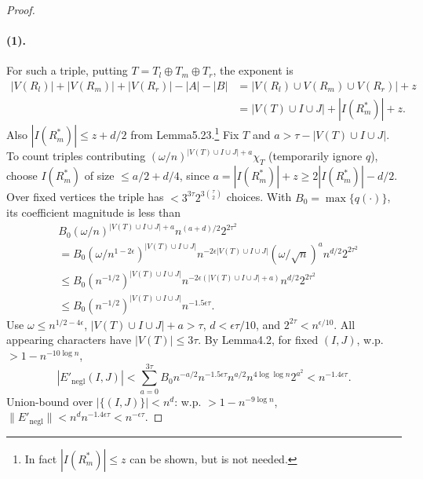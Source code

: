 \begin{proof}
\paragraph{(1).} For such a triple, putting $T=T_l\oplus T_m\oplus T_r$, the exponent is
\begin{align*}|V(R_l)|+|V(R_m)|+|V(R_r)|-|A|-|B|&=|V(R_l)\cup V(R_m)\cup V(R_r)|+z\\&=|V(T)\cup I\cup J|+|I(R^*_m)|+z.\end{align*}
Also $|I(R^*_m)|\le z+d/2$ from Lemma5.23.\footnote{In fact $|I(R^*_m)|\le z$ can be shown, but is not needed.} Fix $T$ and $a>\tau-|V(T)\cup I\cup J|$. To count triples contributing $(\omega/n)^{|V(T)\cup I\cup J|+a}\chi_T$ (temporarily ignore $q$), choose $I(R^*_m)$ of size $\le a/2+d/4$, since $a=|I(R^*_m)|+z\ge2|I(R^*_m)|-d/2$. Over fixed vertices the triple has $<3^{3\tau}2^{3\binom\tau2}$ choices. With $B_0=\max\{q(\cdot)\}$, its coefficient magnitude is less than
\begin{align*}&B_0(\omega/n)^{|V(T)\cup I\cup J|+a}n^{(a+d)/2}2^{2\tau^2}\\&=B_0(\omega/n^{1-2\epsilon})^{|V(T)\cup I\cup J|}n^{-2\epsilon|V(T)\cup I\cup J|}(\omega/\sqrt n)^an^{d/2}2^{2\tau^2}\\&\le B_0(n^{-1/2})^{|V(T)\cup I\cup J|}n^{-2\epsilon(|V(T)\cup I\cup J|+a)}n^{d/2}2^{2\tau^2}\\&\le B_0(n^{-1/2})^{|V(T)\cup I\cup J|}n^{-1.5\epsilon\tau}.\end{align*}
Use $\omega\le n^{1/2-4\epsilon}$, $|V(T)\cup I\cup J|+a>\tau$, $d<\epsilon\tau/10$, and $2^{2\tau}<n^{\epsilon/10}$. All appearing characters have $|V(T)|\le3\tau$. By Lemma4.2, for fixed $(I,J)$, w.p. $>1-n^{-10\log n}$,
\[|E'_{\mathrm{negl}}(I,J)|<\sum_{a=0}^{3\tau}B_0n^{-a/2}n^{-1.5\epsilon\tau}n^{a/2}n^{4\log\log n}2^{a^2}<n^{-1.4\epsilon\tau}.\]
Union-bound over $|\{(I,J)\}|<n^d$: w.p. $>1-n^{-9\log n}$, $\|E'_{\mathrm{negl}}\|<n^d n^{-1.4\epsilon\tau}<n^{-\epsilon\tau}$.

\end{proof}

